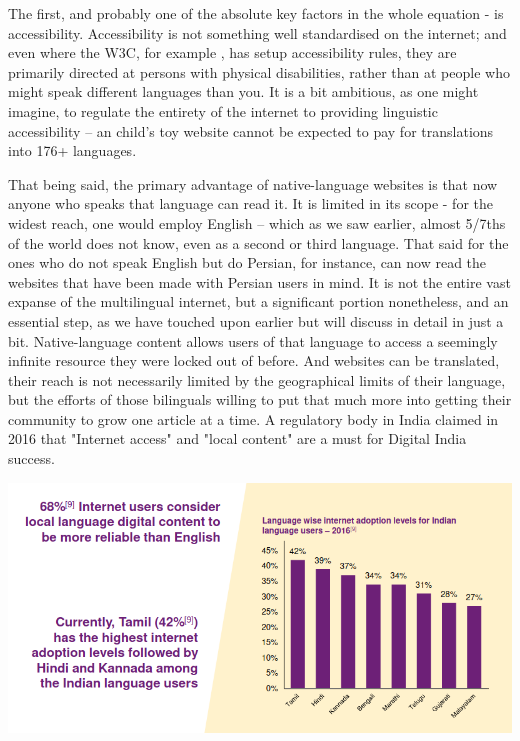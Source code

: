 \documentclass[11pt]{article}
\begin{document}
The first, and probably one of the absolute key factors in the whole equation -
is accessibility. Accessibility is not something well standardised on the
internet; and even where the W3C, for example \cite{initiative_wai_w3c_nodate},
has setup accessibility rules, they are primarily directed at persons with
physical disabilities, rather than at people who might speak different languages
than you. It is a bit ambitious, as one might imagine, to regulate the entirety
of the internet to providing linguistic accessibility -- an child's toy website
cannot be expected to pay for translations into 176+ languages. 

That being said, the primary advantage of native-language websites is that now
anyone who speaks that language can read it. It is limited in its scope - for
the widest reach, one would employ English -- which as we saw earlier, almost
5/7ths of the world does not know, even as a second or third language. That said
for the ones who do not speak English but do Persian, for instance, can now read
the websites that have been made with Persian users in mind. It is not the
entire vast expanse of the multilingual internet, but a significant portion
nonetheless, and an essential step, as we have touched upon earlier but will
discuss in detail in just a bit. Native-language content allows users of that
language to access a seemingly infinite resource they were locked out of before.
And websites can be translated, their reach is not necessarily limited by the
geographical limits of their language, but the efforts of those bilinguals
willing to put that much more into getting their community to grow one article
at a time. A regulatory body in India \cite{noauthor_internet_2016} claimed in
2016 that "Internet access" and "local content" are a must for Digital India
success.

\includegraphics[width=\textwidth]{localrel}
\end{document}
